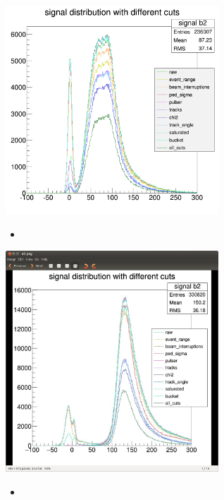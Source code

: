\documentclass[9pt]{beamer}
\begin{document}
\begin{frame}
	\begin{center}
		\includegraphics[width=8cm]{Pics/all}
	\end{center}
	\begin{itemize}
		\item 
	\end{itemize}
\end{frame}
\begin{frame}
	\begin{center}
		\includegraphics[width=8cm]{Pics/augustcuts}
	\end{center}
	\begin{itemize}
		\item 
	\end{itemize}
\end{frame}
\end{document}
